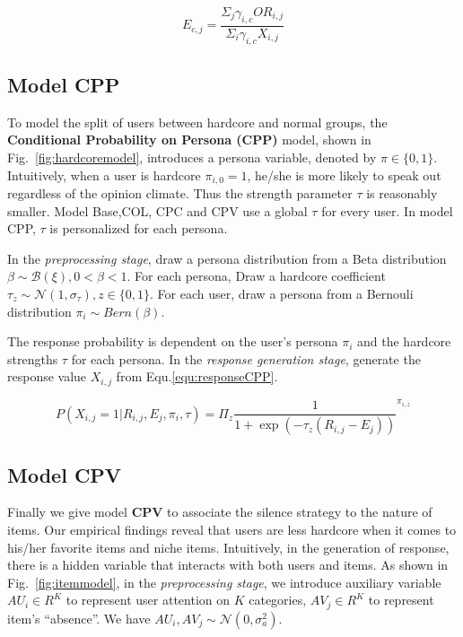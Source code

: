 \documentclass[sigconf]{acmart}
\begin{document}
\begin{equation}\label{equ:ecommunity}
 E_{c,j}=\frac{\Sigma_j\gamma_{i,c} OR_{i,j}}{\Sigma_i \gamma_{i,c} X_{i,j}}
\end{equation}

\subsection{Model CPP}
To model the split of users between hardcore and normal groups, the  \textbf{Conditional Probability on Persona (CPP)} model,  shown in Fig.~\ref{fig:hardcoremodel}, introduces a  persona variable,  denoted by $\pi \in \{0,1\}$. Intuitively, when a user is hardcore $\pi_{i,0}=1$, he/she is more likely to speak out regardless of the opinion climate. Thus the strength parameter $\tau$ is reasonably smaller.  Model Base,COL, CPC and CPV use a global $\tau$ for every user. In model CPP, $\tau$ is personalized for each persona.

In the \textit{preprocessing stage}, draw a persona distribution from a Beta distribution $\beta \sim \mathcal{B}(\xi), 0<\beta<1$. For each persona, Draw a hardcore coefficient $\tau_z \sim \mathcal{N}(1,\sigma_\tau), z\in \{0,1\}$. For each user, draw a persona from a Bernouli distribution $\pi_i \sim Bern (\beta)$.

The response probability is dependent on the user's persona $\pi_i$ and the hardcore strengths $\tau$ for each persona. In the \textit{response generation stage}, generate the response value $X_{i,j}$ from Equ.\ref{equ:responseCPP}.

\begin{equation}\label{equ:responseCPP}
 P(X_{i,j}=1|R_{i,j},E_j,\pi_i,\tau)=\Pi_z {\frac{1}{1+\exp{(-\tau_z(R_{i,j}-E_j))}}}^{\pi_{i,z}}
\end{equation}

\subsection{Model CPV}
Finally we give model \textbf{CPV} to associate the silence strategy to the nature of items. Our empirical findings reveal that users are less hardcore when it comes to his/her favorite items and niche items. Intuitively, in the generation of response, there is a hidden variable that interacts with both users and items. As shown in Fig.~\ref{fig:itemmodel}, in the \textit{preprocessing stage}, we introduce auxiliary variable $AU_i\in R^K$ to represent user attention on $K$ categories, $AV_j\in R^K$ to represent item's ``absence''. We have  $AU_i, AV_j \sim \mathcal{N}(0,\sigma_a^2)$.
\end{document}
